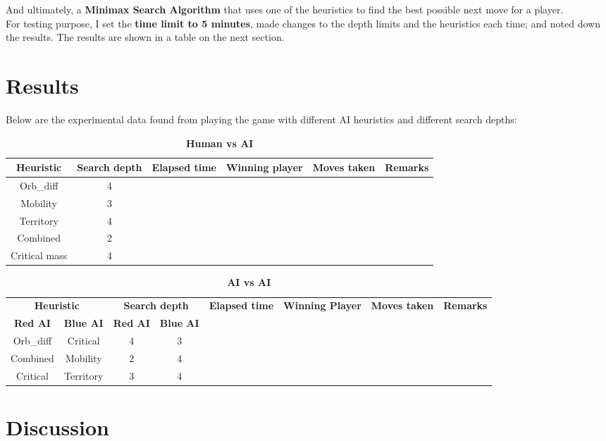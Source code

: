 \documentclass[a4paper, 13pt]{article}
\begin{document}
	And ultimately, a \textbf{Minimax Search Algorithm} that uses one of the heuristics to find the best possible next move for a player.\\
	
	 For testing purpose, I set the \textbf{time limit to 5 minutes},  made changes to the depth limits and the heuristics each time; and noted down the results. The results are shown in a table on the next section.
	 
	\vspace{0.5cm}
	\section*{Results}
		Below are the experimental data found from playing the game with different AI heuristics and different search depths:
		\pagebreak
		\begin{table}[!]
			\centering
			\caption{\textbf{Human vs AI}}
			\vspace{0.2cm}
			\small
			\begin{tabular}{| c | c | c | c | c | c |}
				\hline
				\textbf{Heuristic} & \textbf{Search depth} & \textbf{Elapsed time} & \textbf{Winning player} & \textbf{Moves taken} & \textbf{Remarks}\\
				\hline
				Orb\_diff & 4 &  &  &  & \textbf{}\\
				\hline
				Mobility & 3 &  &  &  & \textbf{}\\
				\hline
				Territory & 4 &  &  &  &  \\
				\hline
				Combined & 2 &  &  &  & \textbf{}\\
				\hline
				Critical mass & 4 &  &  &  & \\
				\hline
			\end{tabular}
		\end{table}
		\vspace{0.4cm}
		
		\begin{table}[!]
			\centering
			\caption{\textbf{AI vs AI}}
			\vspace{0.2cm}
			\small
			\begin{tabular}{| c | c | c | c | c | c | c | c |}
        			\hline
        			\multicolumn{2}{|c|}{\textbf{Heuristic}} & 
        			\multicolumn{2}{c|}{\textbf{Search depth}} & 
        			\multirow{2}{*}{\textbf{Elapsed time}} & 
        			\multirow{2}{*}{\textbf{Winning Player}} & 
        			\multirow{2}{*}{\textbf{Moves taken}} & 
        			\multirow{2}{*}{\textbf{Remarks}} \\
        			\cline{1-4}
        			\textbf{Red AI} & \textbf{Blue AI} & \textbf{Red AI} 						& \textbf{Blue AI} & & & & \\
        			\hline
        			Orb\_diff & Critical & 4 & 3 & & & & \\
        			\hline
        			Combined & Mobility & 2 & 4 & & & & \\
        			\hline
        			Critical & Territory & 3 & 4 & & & & \\
        			\hline
    			\end{tabular}
		\end{table}
		
	\vspace{0.5cm}
	\section*{Discussion}
	
	
\end{document}
